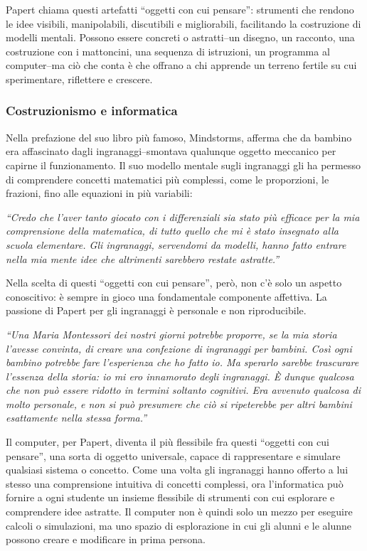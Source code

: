Papert chiama questi artefatti ``oggetti con cui pensare'': strumenti che rendono le idee visibili, manipolabili, discutibili e migliorabili, facilitando la costruzione di modelli mentali. Possono essere concreti o astratti--un disegno, un racconto, una costruzione con i mattoncini, una sequenza di istruzioni, un programma al computer--ma ciò che conta è che offrano a chi apprende un terreno fertile su cui sperimentare, riflettere e crescere.


\subsubsection{Costruzionismo e informatica}


Nella prefazione del suo libro più famoso, Mindstorms, \textcite{papert-mindstorms-1980} afferma che da bambino era affascinato dagli ingranaggi--smontava qualunque oggetto meccanico per capirne il funzionamento. Il suo modello mentale sugli ingranaggi gli ha permesso di comprendere concetti matematici più complessi, come le proporzioni, le frazioni, fino alle equazioni in più variabili:


\emph{``Credo che l'aver tanto giocato con i differenziali sia stato più efficace per la mia comprensione della matematica, di tutto quello che mi è stato insegnato alla scuola elementare. Gli ingranaggi, servendomi da modelli, hanno fatto entrare nella mia mente idee che altrimenti sarebbero restate astratte.''}


Nella scelta di questi ``oggetti con cui pensare'', però, non c'è solo un aspetto conoscitivo: è sempre in gioco una fondamentale componente affettiva. La passione di Papert per gli ingranaggi è personale e non riproducibile.


\emph{``Una Maria Montessori dei nostri giorni potrebbe proporre, se la mia storia l'avesse convinta, di creare una confezione di ingranaggi per bambini. Così ogni bambino potrebbe fare l'esperienza che ho fatto io. Ma sperarlo sarebbe trascurare l'essenza della storia: io mi ero innamorato degli ingranaggi. È dunque qualcosa che non può essere ridotto in termini soltanto cognitivi. Era avvenuto qualcosa di molto personale, e non si può presumere che ciò si ripeterebbe per altri bambini esattamente nella stessa forma.''}


Il computer, per Papert, diventa il più flessibile fra questi ``oggetti con cui pensare'', una sorta di oggetto universale, capace di rappresentare e simulare qualsiasi sistema o concetto. Come una volta gli ingranaggi hanno offerto a lui stesso una comprensione intuitiva di concetti complessi, ora l'informatica può fornire a ogni studente un insieme flessibile di strumenti con cui esplorare e comprendere idee astratte. Il computer non è quindi solo un mezzo per eseguire calcoli o simulazioni, ma uno spazio di esplorazione in cui gli alunni e le alunne possono creare e modificare in prima persona.


